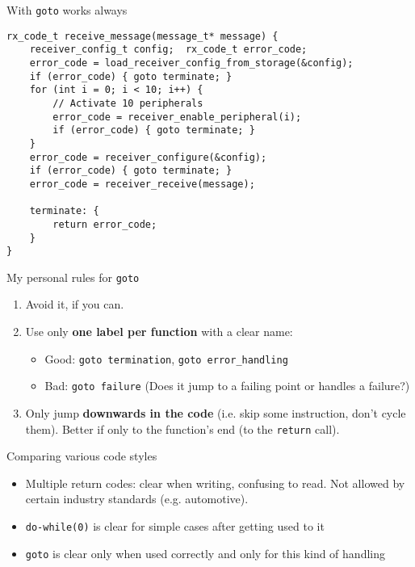 \documentclass[aspectratio=169,14pt]{beamer}
\begin{document}
\begin{frame}[fragile]{With \texttt{goto} works always}
\begin{lstlisting}[style=cstyle]
rx_code_t receive_message(message_t* message) {
    receiver_config_t config;  rx_code_t error_code;
    error_code = load_receiver_config_from_storage(&config);
    if (error_code) { goto terminate; }
    for (int i = 0; i < 10; i++) {
        // Activate 10 peripherals
        error_code = receiver_enable_peripheral(i);
        if (error_code) { goto terminate; }
    }
    error_code = receiver_configure(&config);
    if (error_code) { goto terminate; }
    error_code = receiver_receive(message);
    
    terminate: {
        return error_code;
    }
}
\end{lstlisting}
\end{frame}



\begin{frame}{My personal rules for \texttt{goto}}
\begin{enumerate}
    \item Avoid it, if you can.
    \item Use only \textbf{one label per function} with a clear name:\\
        \begin{itemize}
            \item Good: \texttt{goto termination}, \texttt{goto error\_handling}
            \item Bad: \texttt{goto failure}  (Does it jump to a failing point or handles a failure?)
        \end{itemize}
    \item Only jump \textbf{downwards in the code} (i.e. skip some instruction, don’t cycle them). Better if only to the function's end (to the \texttt{return} call).
\end{enumerate}
\end{frame}



\begin{frame}{Comparing various code styles}
\begin{itemize}
    \item Multiple return codes: clear when writing, confusing to read. Not allowed by certain industry standards (e.g. automotive).
    \item \texttt{do-while(0)} is clear for simple cases after getting used to it
    \item \texttt{goto} is clear only when used correctly and only for this kind of handling
\end{itemize}
\end{frame}
\end{document}
